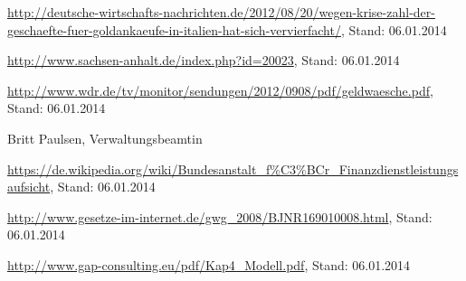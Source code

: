 \documentclass{article}
\begin{document}
    \begin{thebibliography}{9}

         \url{http://deutsche-wirtschafts-nachrichten.de/2012/08/20/wegen-krise-zahl-der-geschaefte-fuer-goldankaeufe-in-italien-hat-sich-vervierfacht/}, Stand: 06.01.2014

         \url{http://www.sachsen-anhalt.de/index.php?id=20023}, Stand: 06.01.2014

         \url{http://www.wdr.de/tv/monitor/sendungen/2012/0908/pdf/geldwaesche.pdf}, Stand: 06.01.2014

         Britt Paulsen, Verwaltungsbeamtin

         \url{https://de.wikipedia.org/wiki/Bundesanstalt_f%C3%BCr_Finanzdienstleistungsaufsicht}, Stand: 06.01.2014

         \url{http://www.gesetze-im-internet.de/gwg_2008/BJNR169010008.html}, Stand: 06.01.2014

         \url{http://www.gap-consulting.eu/pdf/Kap4_Modell.pdf}, Stand: 06.01.2014
        
    \end{thebibliography}
\end{document}

